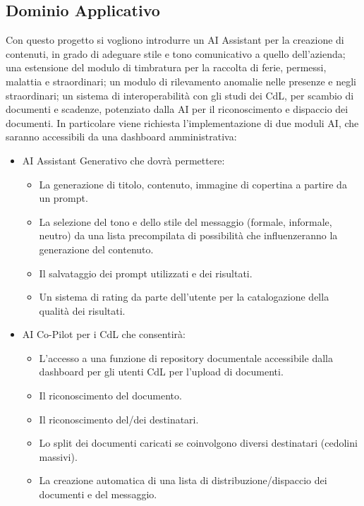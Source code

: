 \documentclass[a4paper,12pt]{article}
\begin{document}
    \subsection{Dominio Applicativo}
    Con questo progetto si vogliono introdurre un AI Assistant per la creazione di contenuti, in grado di adeguare stile e tono comunicativo a quello dell’azienda; una estensione del modulo di timbratura per la raccolta di ferie, permessi, malattia e straordinari; un modulo di rilevamento anomalie nelle presenze e negli straordinari; un sistema di interoperabilità con gli studi dei CdL, per scambio di documenti e scadenze, potenziato dalla AI per il riconoscimento e dispaccio dei documenti.
    In particolare viene richiesta l’implementazione di due moduli AI, che saranno accessibili da una dashboard amministrativa:
    \begin{itemize}
        \item AI Assistant Generativo che dovrà permettere:
        \begin{itemize}
	        \item La generazione di titolo, contenuto, immagine di copertina a partire da un prompt. 
	        \item La selezione del tono e dello stile del messaggio (formale, informale, neutro) da una lista precompilata di possibilità che influenzeranno la generazione del contenuto. 
	        \item Il salvataggio dei prompt utilizzati e dei risultati. 
	        \item Un sistema di rating da parte dell’utente per la catalogazione della qualità dei risultati.
        \end{itemize}
        \item AI Co-Pilot per i CdL che consentirà:
        \begin{itemize}
	        \item L’accesso a una funzione di repository documentale accessibile dalla dashboard per gli utenti CdL per l’upload di documenti. 
	        \item Il riconoscimento del documento. 
	        \item Il riconoscimento del/dei destinatari. 
	        \item Lo split dei documenti caricati se coinvolgono diversi destinatari (cedolini massivi). 
	        \item La creazione automatica di una lista di distribuzione/dispaccio dei documenti e del messaggio.
        \end{itemize}
    \end{itemize}
\end{document}
